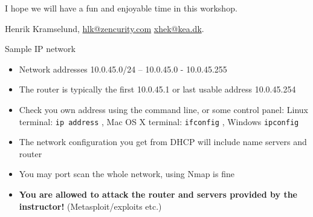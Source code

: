 \documentclass[a4paper,11pt,notitlepage,landscape]{report}
\begin{document}
I hope we will have a fun and enjoyable time in this workshop.


Henrik Kramselund, \url{hlk@zencurity.com} \url{xhek@kea.dk}.

\eject

{\LARGE Sample IP network}

\begin{itemize}
\item Network addresses 10.0.45.0/24 -- 10.0.45.0 - 10.0.45.255
\item The router is typically the first 10.0.45.1 or last usable address 10.0.45.254
\item Check you own address using the command line, or some control panel:
Linux terminal: \verb+ip address+ ,
Mac OS X terminal: \verb+ifconfig+ ,
Windows \verb+ipconfig+
\item The network configuration you get from DHCP will include name servers and router
\item You may port scan the whole network, using Nmap is fine
\item {\bf You are allowed to attack the router and servers provided by the instructor!} (Metasploit/exploits etc.)
\end{itemize}
\end{document}
